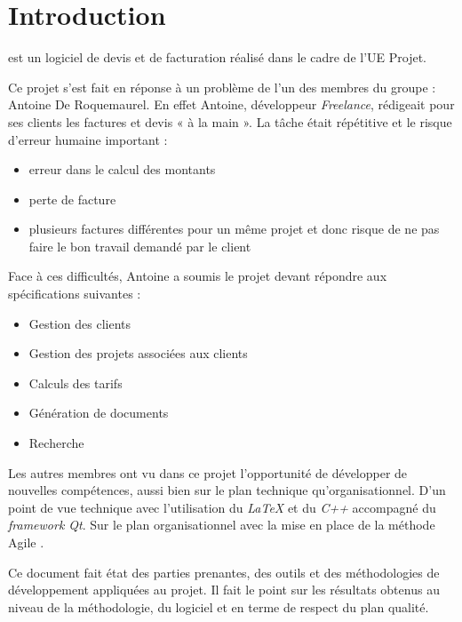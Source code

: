 \chapter*{Introduction}

\setlength{\parindent}{1cm}
\FactDev{}  est un logiciel de devis et de facturation réalisé dans le cadre de l’UE Projet. 

Ce projet s’est fait en réponse à un problème de l’un des membres du groupe : Antoine De Roquemaurel. En effet Antoine, développeur \textit{Freelance}, rédigeait pour ses clients les factures et devis « à la main ». La tâche était répétitive et le risque d’erreur humaine important : 
\begin{itemize}
	\item erreur dans le calcul des montants
	\item perte de facture
	\item plusieurs factures différentes pour un même projet et donc risque de ne pas faire le bon travail demandé par le client
\end{itemize}

Face à ces difficultés, Antoine a soumis le projet devant répondre aux spécifications suivantes :
\begin{itemize}
	\item Gestion des clients
	\item Gestion des projets associées aux clients
	\item Calculs des tarifs
	\item Génération de documents
	\item Recherche
\end{itemize}


Les autres membres ont vu dans ce projet l'opportunité de développer de nouvelles compétences, aussi bien sur le plan technique qu'organisationnel. D'un point de vue technique avec l'utilisation du \textit{LaTeX} et du \textit{C++} accompagné du \textit{framework Qt}. Sur le plan organisationnel avec la mise en place de la méthode Agile \Scrum. 

Ce document fait état des parties prenantes, des outils et des méthodologies de développement appliquées au projet. Il fait le point sur les résultats obtenus au niveau de la méthodologie, du logiciel et en terme de respect du plan qualité. 